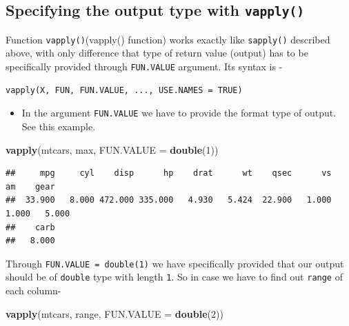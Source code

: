 \documentclass[
]{book}
\newenvironment{Shaded}{\begin{snugshade}}{\end{snugshade}}
\newcommand{\AttributeTok}[1]{\textcolor[rgb]{0.13,0.29,0.53}{#1}}
\newcommand{\DecValTok}[1]{\textcolor[rgb]{0.00,0.00,0.81}{#1}}
\newcommand{\FunctionTok}[1]{\textcolor[rgb]{0.13,0.29,0.53}{\textbf{#1}}}
\newcommand{\NormalTok}[1]{#1}
\providecommand{\tightlist}{%
  \setlength{\itemsep}{0pt}\setlength{\parskip}{0pt}}
\begin{document}
\hypertarget{specifying-the-output-type-with-vapply}{%
\subsection{\texorpdfstring{Specifying the output type with \texttt{vapply()}}{Specifying the output type with vapply()}}\label{specifying-the-output-type-with-vapply}}

Function \texttt{vapply()}\index(vapply() function) works exactly like \texttt{sapply()} described above, with only difference that type of return value (output) has to be specifically provided through \texttt{FUN.VALUE} argument. Its syntax is -

\begin{verbatim}
vapply(X, FUN, FUN.VALUE, ..., USE.NAMES = TRUE)
\end{verbatim}

\begin{itemize}
\tightlist
\item
  In the argument \texttt{FUN.VALUE} we have to provide the format type of output. See this example.
\end{itemize}

\begin{Shaded}
\begin{Highlighting}[]
\FunctionTok{vapply}\NormalTok{(mtcars, max, }\AttributeTok{FUN.VALUE =} \FunctionTok{double}\NormalTok{(}\DecValTok{1}\NormalTok{))}
\end{Highlighting}
\end{Shaded}

\begin{verbatim}
##     mpg     cyl    disp      hp    drat      wt    qsec      vs      am    gear 
##  33.900   8.000 472.000 335.000   4.930   5.424  22.900   1.000   1.000   5.000 
##    carb 
##   8.000
\end{verbatim}

Through \texttt{FUN.VALUE\ =\ double(1)} we have specifically provided that our output should be of \texttt{double} type with length \texttt{1}. So in case we have to find out \texttt{range} of each column-

\begin{Shaded}
\begin{Highlighting}[]
\FunctionTok{vapply}\NormalTok{(mtcars, range, }\AttributeTok{FUN.VALUE =} \FunctionTok{double}\NormalTok{(}\DecValTok{2}\NormalTok{))}
\end{Highlighting}
\end{Shaded}
\end{document}
